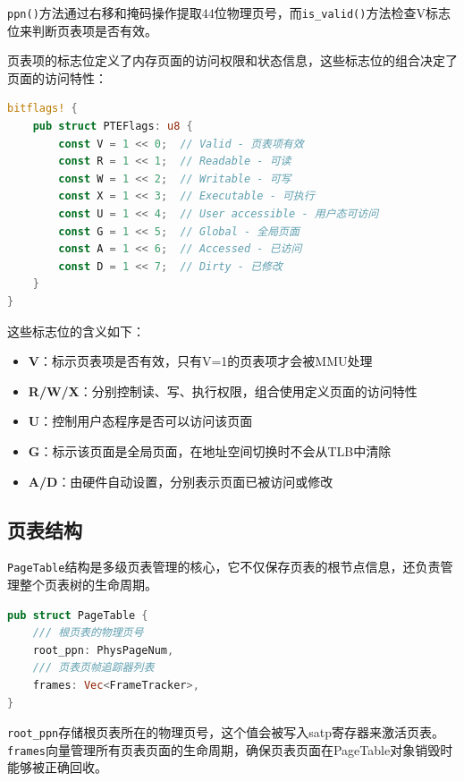 \lstinline[language=Rust]{ppn()}方法通过右移和掩码操作提取44位物理页号，而\lstinline[language=Rust]{is_valid()}方法检查V标志位来判断页表项是否有效。

页表项的标志位定义了内存页面的访问权限和状态信息，这些标志位的组合决定了页面的访问特性：

\begin{lstlisting}[language=Rust,caption={页表项标志位定义}, label={lst:pte-flags}]
bitflags! {
    pub struct PTEFlags: u8 {
        const V = 1 << 0;  // Valid - 页表项有效
        const R = 1 << 1;  // Readable - 可读
        const W = 1 << 2;  // Writable - 可写
        const X = 1 << 3;  // Executable - 可执行
        const U = 1 << 4;  // User accessible - 用户态可访问
        const G = 1 << 5;  // Global - 全局页面
        const A = 1 << 6;  // Accessed - 已访问
        const D = 1 << 7;  // Dirty - 已修改
    }
}
\end{lstlisting}

这些标志位的含义如下：
\begin{itemize}
    \item \textbf{V}：标示页表项是否有效，只有V=1的页表项才会被MMU处理
    \item \textbf{R/W/X}：分别控制读、写、执行权限，组合使用定义页面的访问特性
    \item \textbf{U}：控制用户态程序是否可以访问该页面
    \item \textbf{G}：标示该页面是全局页面，在地址空间切换时不会从TLB中清除
    \item \textbf{A/D}：由硬件自动设置，分别表示页面已被访问或修改
\end{itemize}

\subsection{页表结构}

\lstinline[language=Rust]{PageTable}结构是多级页表管理的核心，它不仅保存页表的根节点信息，还负责管理整个页表树的生命周期。

\begin{lstlisting}[language=Rust,caption={页表结构}, label={lst:page-table-struct}]
pub struct PageTable {
    /// 根页表的物理页号
    root_ppn: PhysPageNum,
    /// 页表页帧追踪器列表
    frames: Vec<FrameTracker>,
}
\end{lstlisting}

\lstinline[language=Rust]{root_ppn}存储根页表所在的物理页号，这个值会被写入satp寄存器来激活页表。\lstinline[language=Rust]{frames}向量管理所有页表页面的生命周期，确保页表页面在PageTable对象销毁时能够被正确回收。

